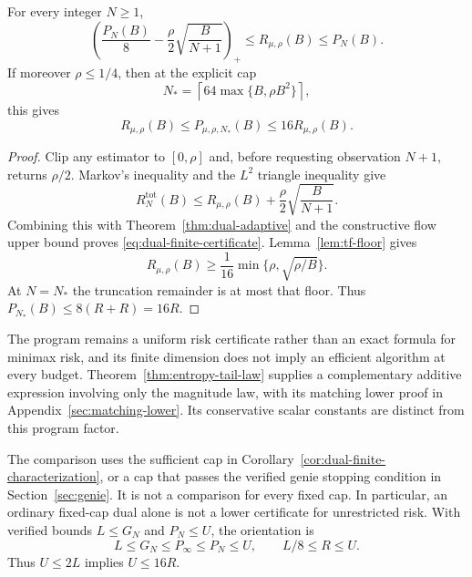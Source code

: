 \begin{corollary}
\label{cor:dual-finite-characterization}
For every integer $N\ge1$,
\begin{equation}
 \left(\frac{P_N(B)}8-
       \frac\rho2\sqrt{\frac B{N+1}}\right)_+
 \le R_{\mu,\rho}(B)\le P_N(B).
 \label{eq:dual-finite-certificate}
\end{equation}
If moreover $\rho\le1/4$, then at the explicit cap
\[
 N_*=\left\lceil64\max\{B,\rho B^2\}\right\rceil,
\]
this gives
\begin{equation}
 \boxed{R_{\mu,\rho}(B)\le P_{\mu,\rho,N_*}(B)
                         \le16R_{\mu,\rho}(B).}
 \label{eq:dual-factor-sixteen}
\end{equation}
\end{corollary}

\begin{proof}
Clip any estimator to
$[0,\rho]$ and, before requesting observation $N+1$, returns $\rho/2$.
Markov's inequality and the $L^2$ triangle inequality give
\[
 R_N^{\mathrm{tot}}(B)
 \le R_{\mu,\rho}(B)+\frac\rho2\sqrt{\frac B{N+1}}.
\]
Combining this with Theorem~\ref{thm:dual-adaptive} and the constructive
flow upper bound proves \eqref{eq:dual-finite-certificate}.
Lemma~\ref{lem:tf-floor} gives
\[
 R_{\mu,\rho}(B)\ge\frac1{16}
                 \min\{\rho,\sqrt{\rho/B}\}.
\]
At $N=N_*$ the truncation remainder is at most that floor. Thus
$P_{N_*}(B)\le8(R+R)=16R$.
\end{proof}

The program remains a uniform risk certificate rather than an exact formula
for minimax risk, and its finite dimension does not imply an efficient
algorithm at every budget. Theorem~\ref{thm:entropy-tail-law} supplies a
complementary additive expression involving only the magnitude law, with
its matching lower proof in Appendix~\ref{sec:matching-lower}. Its
conservative scalar constants are distinct from this program factor.


\begin{remark}
The comparison uses the sufficient cap in
Corollary~\ref{cor:dual-finite-characterization}, or a cap that passes
the verified genie stopping condition in Section~\ref{sec:genie}.
It is not a comparison for every fixed cap. In particular, an ordinary
fixed-cap dual alone is not a lower certificate for unrestricted risk.
With verified bounds $L\le G_N$ and $P_N\le U$, the orientation is
\[
 L\le G_N\le P_\infty\le P_N\le U,\qquad L/8\le R\le U.
\]
Thus $U\le2L$ implies $U\le16R$.
\end{remark}
